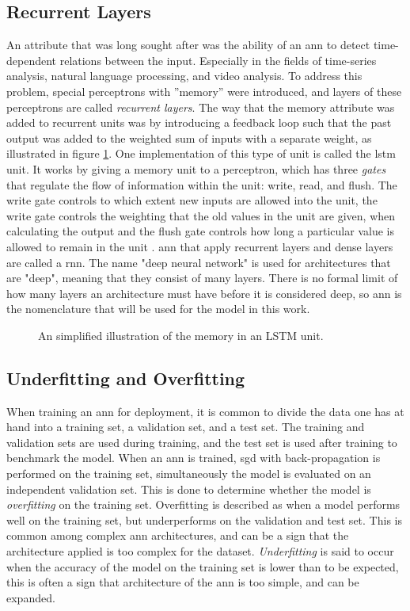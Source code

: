 \subsection{Recurrent Layers}
An attribute that was long sought after was the ability of an \acrshort{ann} to detect time-dependent relations between the input. Especially in the fields of time-series analysis, natural language processing, and video analysis. To address this problem, special perceptrons with ''memory'' were introduced, and layers of these perceptrons are called \textit{recurrent layers}. The way that the memory attribute was added to recurrent units was by introducing a feedback loop such that the past output was added to the weighted sum of inputs with a separate weight, as illustrated in figure \ref{fig:lstm}. One implementation of this type of unit is called the \acrfull{lstm} unit. It works by giving a memory unit to a perceptron, which has three \textit{gates} that regulate the flow of information within the unit: write, read, and flush. The write gate controls to which extent new inputs are allowed into the unit, the write gate controls the weighting that the old values in the unit are given, when calculating the output and the flush gate controls how long a particular value is allowed to remain in the unit \cite{lstm_wikipedia}. \acrshort{ann} that apply recurrent layers and dense layers are called a \acrfull{rnn}. The name "deep neural network" is used for architectures that are "deep", meaning that they consist of many layers. There is no formal limit of how many layers an architecture must have before it is considered deep, so \acrfull{ann} is the nomenclature that will be used for the model in this work. 

\begin{figure}[H]
    \centering
    
    \caption{An simplified illustration of the memory in an LSTM unit.}
    \label{fig:lstm}
\end{figure}

\subsection{Underfitting and Overfitting}
When training an \acrshort{ann} for deployment, it is common to divide the data one has at hand into a training set, a validation set, and a test set. The training and validation sets are used during training, and the test set is used after training to benchmark the model. When an \acrshort{ann} is trained, \acrshort{sgd} with back-propagation is performed on the training set, simultaneously the model is evaluated on an independent validation set. This is done to determine whether the model is \textit{overfitting} on the training set. Overfitting is described as when a model performs well on the training set, but underperforms on the validation and test set. This is common among complex \acrshort{ann} architectures, and can be a sign that the architecture applied is too complex for the dataset. \textit{Underfitting} is said to occur when the accuracy of the model on the training set is lower than to be expected, this is often a sign that architecture of the \acrshort{ann} is too simple, and can be expanded.


